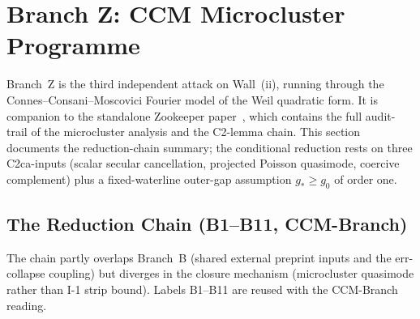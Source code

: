 \documentclass[12pt,a4paper]{article}
\theoremstyle{definition}
\theoremstyle{remark}
\begin{document}
\section{Branch Z: CCM Microcluster Programme}
\label{sec:branch-z}

Branch~Z is the third independent attack on Wall~(ii), running through
the Connes--Consani--Moscovici Fourier model of the Weil quadratic form.
It is companion to the standalone Zookeeper
paper~\cite{Geiger2026zookeeper}, which contains the full audit-trail of
the microcluster analysis and the C2-lemma chain. This section documents
the reduction-chain summary; the conditional reduction rests on three
C2ca-inputs (scalar secular cancellation, projected Poisson quasimode,
coercive complement) plus a fixed-waterline outer-gap assumption
$g_*\ge g_0$ of order one.


\subsection{The Reduction Chain (B1--B11, CCM-Branch)}
\label{sec:branch-z-chain}

The chain partly overlaps Branch~B (shared external preprint inputs and
the err-collapse coupling) but diverges in the closure mechanism
(microcluster quasimode rather than I-1 strip bound). Labels B1--B11 are
reused with the CCM-Branch reading.
\end{document}
